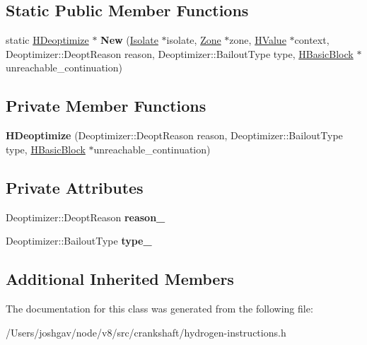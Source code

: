 \subsection*{Static Public Member Functions}
\begin{DoxyCompactItemize}
\item 
static \hyperlink{classv8_1_1internal_1_1_h_deoptimize}{H\+Deoptimize} $\ast$ {\bfseries New} (\hyperlink{classv8_1_1internal_1_1_isolate}{Isolate} $\ast$isolate, \hyperlink{classv8_1_1internal_1_1_zone}{Zone} $\ast$zone, \hyperlink{classv8_1_1internal_1_1_h_value}{H\+Value} $\ast$context, Deoptimizer\+::\+Deopt\+Reason reason, Deoptimizer\+::\+Bailout\+Type type, \hyperlink{classv8_1_1internal_1_1_h_basic_block}{H\+Basic\+Block} $\ast$unreachable\+\_\+continuation)\hypertarget{classv8_1_1internal_1_1_h_deoptimize_a8499b9c5d95922019856aec8374cfb5e}{}\label{classv8_1_1internal_1_1_h_deoptimize_a8499b9c5d95922019856aec8374cfb5e}

\end{DoxyCompactItemize}
\subsection*{Private Member Functions}
\begin{DoxyCompactItemize}
\item 
{\bfseries H\+Deoptimize} (Deoptimizer\+::\+Deopt\+Reason reason, Deoptimizer\+::\+Bailout\+Type type, \hyperlink{classv8_1_1internal_1_1_h_basic_block}{H\+Basic\+Block} $\ast$unreachable\+\_\+continuation)\hypertarget{classv8_1_1internal_1_1_h_deoptimize_a482a604e2a99b13809b411eed5f4c8d5}{}\label{classv8_1_1internal_1_1_h_deoptimize_a482a604e2a99b13809b411eed5f4c8d5}

\end{DoxyCompactItemize}
\subsection*{Private Attributes}
\begin{DoxyCompactItemize}
\item 
Deoptimizer\+::\+Deopt\+Reason {\bfseries reason\+\_\+}\hypertarget{classv8_1_1internal_1_1_h_deoptimize_a999653be6be73c6aaa21d05a302bfaf6}{}\label{classv8_1_1internal_1_1_h_deoptimize_a999653be6be73c6aaa21d05a302bfaf6}

\item 
Deoptimizer\+::\+Bailout\+Type {\bfseries type\+\_\+}\hypertarget{classv8_1_1internal_1_1_h_deoptimize_a9913dd3ff6a2d3ff09a6f2684fcd74f7}{}\label{classv8_1_1internal_1_1_h_deoptimize_a9913dd3ff6a2d3ff09a6f2684fcd74f7}

\end{DoxyCompactItemize}
\subsection*{Additional Inherited Members}


The documentation for this class was generated from the following file\+:\begin{DoxyCompactItemize}
\item 
/\+Users/joshgav/node/v8/src/crankshaft/hydrogen-\/instructions.\+h\end{DoxyCompactItemize}
